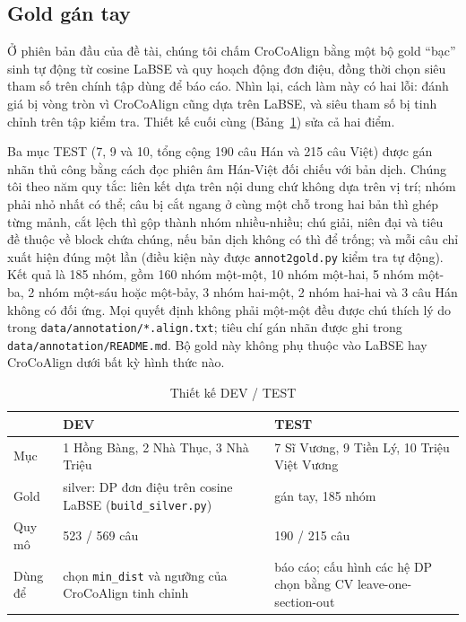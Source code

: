 \documentclass[11pt,a4paper]{article}
\newcommand{\code}[1]{\texttt{#1}}
\newcommand{\B}[1]{\textbf{#1}}
\newcommand{\croco}{CroCoAlign}
\begin{document}
\subsection{Gold gán tay}\label{sec:gold}
Ở phiên bản đầu của đề tài, chúng tôi chấm \croco{} bằng một bộ gold ``bạc'' sinh tự động từ cosine LaBSE và quy hoạch
động đơn điệu, đồng thời chọn siêu tham số trên chính tập dùng để báo cáo. Nhìn lại, cách làm này có hai lỗi: đánh giá
bị vòng tròn vì \croco{} cũng dựa trên LaBSE, và siêu tham số bị tinh chỉnh trên tập kiểm tra. Thiết kế cuối cùng
(Bảng~\ref{tab:design}) sửa cả hai điểm.

Ba mục TEST (7, 9 và 10, tổng cộng 190 câu Hán và 215 câu Việt) được gán nhãn thủ công bằng cách đọc phiên âm Hán-Việt
đối chiếu với bản dịch. Chúng tôi theo năm quy tắc: liên kết dựa trên nội dung chứ không dựa trên vị trí; nhóm phải nhỏ
nhất có thể; câu bị cắt ngang ở cùng một chỗ trong hai bản thì ghép từng mảnh, cắt lệch thì gộp thành nhóm nhiều-nhiều;
chú giải, niên đại và tiêu đề thuộc về block chứa chúng, nếu bản dịch không có thì để trống; và mỗi câu chỉ xuất hiện
đúng một lần (điều kiện này được \code{annot2gold.py} kiểm tra tự động). Kết quả là 185 nhóm, gồm 160 nhóm một-một, 10
nhóm một-hai, 5 nhóm một-ba, 2 nhóm một-sáu hoặc một-bảy, 3 nhóm hai-một, 2 nhóm hai-hai và 3 câu Hán không có đối
ứng. Mọi quyết định không phải một-một đều được chú thích lý do trong \code{data/annotation/*.align.txt}; tiêu chí gán nhãn
được ghi trong \code{data/annotation/README.md}. Bộ gold này không phụ thuộc vào LaBSE hay
\croco{} dưới bất kỳ hình thức nào.

\begin{table}[h]\centering\small
\caption{Thiết kế DEV / TEST}\label{tab:design}
\begin{tabular}{p{2.0cm}p{6.1cm}p{7.1cm}}
\toprule
 & \B{DEV} & \B{TEST}\\
\midrule
Mục & 1 Hồng Bàng, 2 Nhà Thục, 3 Nhà Triệu & 7 Sĩ Vương, 9 Tiền Lý, 10 Triệu Việt Vương\\
Gold & silver: DP đơn điệu trên cosine LaBSE (\code{build\_silver.py}) & gán tay, 185 nhóm\\
Quy mô & 523 / 569 câu & 190 / 215 câu\\
Dùng để & chọn \code{min\_dist} và ngưỡng của \croco{} tinh chỉnh & báo cáo; cấu hình các hệ DP chọn bằng CV leave-one-section-out\\
\bottomrule
\end{tabular}
\end{table}
\end{document}

